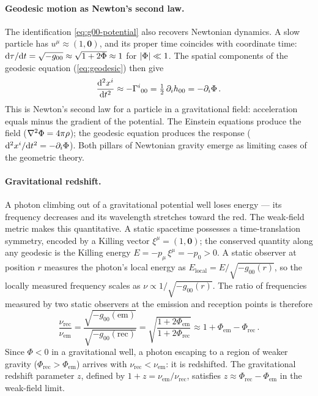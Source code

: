 \paragraph{Geodesic motion as Newton's second law.}

The identification \cref{eq:g00-potential} also recovers Newtonian
dynamics.  A slow particle has $u^\mu \approx (1,\mathbf{0})$, and
its proper time coincides with coordinate time:
$\mathrm{d}\tau/\mathrm{d} t = \sqrt{-g_{00}} \approx \sqrt{1+2\Phi} \approx 1$
for $\left\lvert \Phi \right\rvert \ll 1$.  The spatial components of the geodesic
equation (\cref{eq:geodesic}) then give
%
\begin{equation}
  \frac{\mathrm{d}^2 x^i}{\mathrm{d} t^2}
    \approx -\Gamma^{i}{}_{0 0}
    = \tfrac{1}{2}\,\partial_{i} h_{00}
    = -\partial_{i} \Phi \,.
  \label{eq:newton-from-geodesic}
\end{equation}
%
This is Newton's second law for a particle in a gravitational field:
acceleration equals minus the gradient of the potential.  The Einstein
equations produce the field ($\nabla^{2}\Phi = 4\pi\rho$); the geodesic
equation produces the response
($\mathrm{d}^2 x^i / \mathrm{d} t^2 = -\partial_{i}\Phi$).  Both pillars of Newtonian
gravity emerge as limiting cases of the geometric theory.

\paragraph{Gravitational redshift.}

A photon climbing out of a gravitational potential well loses energy ---
its frequency decreases and its wavelength stretches toward the red.
The weak-field metric makes this quantitative.  A static spacetime
possesses a time-translation symmetry, encoded by a Killing vector
$\xi^\mu = (1,\mathbf{0})$; the conserved quantity along any geodesic
is the Killing energy $E = -p_\mu\,\xi^\mu = -p_0 > 0$.
A static observer at position $r$ measures the photon's local energy
as $E_{\text{local}} = E/\sqrt{-g_{00}(r)}$, so the locally measured
frequency scales as $\nu \propto 1/\sqrt{-g_{00}(r)}$.  The ratio
of frequencies measured by two static observers at the emission and
reception points is therefore
%
\begin{equation}
  \frac{\nu_{\text{rec}}}{\nu_{\text{em}}}
    = \frac{\sqrt{-g_{00}(\text{em})}}{\sqrt{-g_{00}(\text{rec})}}
    = \sqrt{\frac{1 + 2\Phi_{\text{em}}}{1 + 2\Phi_{\text{rec}}}}
    \approx 1 + \Phi_{\text{em}} - \Phi_{\text{rec}} \,.
  \label{eq:grav-redshift}
\end{equation}
%
Since $\Phi < 0$ in a gravitational well, a photon escaping to a
region of weaker gravity ($\Phi_{\text{rec}} > \Phi_{\text{em}}$)
arrives with $\nu_{\text{rec}} < \nu_{\text{em}}$: it is redshifted.
The gravitational redshift parameter $z$, defined by
$1 + z = \nu_{\text{em}}/\nu_{\text{rec}}$, satisfies
$z \approx \Phi_{\text{rec}} - \Phi_{\text{em}}$ in the weak-field
limit.

